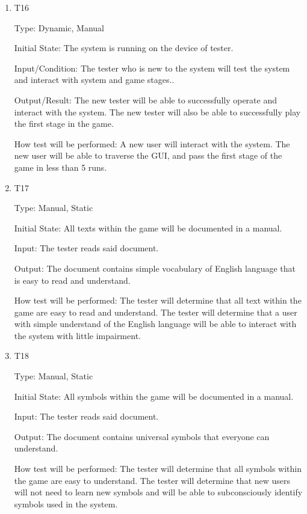 \documentclass[12pt, titlepage]{article}
\begin{document}
\begin{enumerate}

\item{T16}

Type: Dynamic, Manual

Initial State: The system is running on the device of tester.

Input/Condition: The tester who is new to the system will test the system and interact with system and game stages..

Output/Result: The new tester will be able to successfully operate and interact with the system. The new tester will also be able to successfully play the first stage in the game.

How test will be performed: A new user will interact with the system. The new user will be able to traverse the GUI, and pass the first stage of the game in less than 5 runs.

\item{T17}

Type: Manual, Static

Initial State: All texts within the game will be documented in a manual.

Input: The tester reads said document.

Output: The document contains simple vocabulary of English language that is easy to read and understand.

How test will be performed: The tester will determine that all text within the game are easy to read and understand. The tester will determine that a user with simple understand of the English language will be able to interact with the system with little impairment.

\item{T18}

Type: Manual, Static

Initial State: All symbols within the game will be documented in a manual.

Input: The tester reads said document.

Output: The document contains universal symbols that everyone can understand.

How test will be performed: The tester will determine that all symbols within the game are easy to understand. The tester will determine that new users will not need to learn new symbols and will be able to subconsciously identify symbols used in the system.

\end{enumerate}
\end{document}
